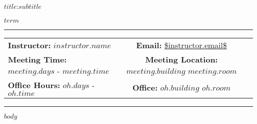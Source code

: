 \documentclass[11pt, a4paper]{article}
\begin{document}
    \begin{center}
        {\Large \textsc{$title$:$subtitle$}}
    \end{center}
    \begin{center}
        $term$
    \end{center}
    \begin{center}
        \rule{6in}{0.4pt}
        \begin{minipage}[t]{.75\textwidth}
            \begin{tabular}{lcc}
                \textbf{Instructor:} $instructor.name$ & \textbf{Email:} \url{$instructor.email$} \\ \textbf{Meeting Time:} $meeting.days$ - $meeting.time$ & \textbf{Meeting Location:} $meeting.building$ $meeting.room$ \\ \textbf{Office Hours:} $oh.days$ - $oh.time$ & \textbf{Office:} $oh.building$ $oh.room$
            \end{tabular}
        \end{minipage}
        \rule{6in}{0.4pt}
    \end{center}
    \vspace{.5cm}
    \setlength{\unitlength}{1in}
    $body$
\end{document}
